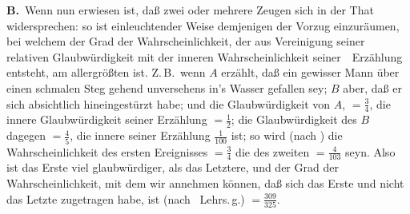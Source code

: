 \vabst \textbf{B.}~Wenn nun erwiesen ist, daß zwei oder mehrere Zeugen sich in der That widersprechen: so ist einleuchtender Weise demjenigen der Vorzug einzuräumen, bei welchem der Grad der Wahrscheinlichkeit, der aus Vereinigung seiner relativen Glaubwürdigkeit mit der inneren Wahrscheinlichkeit seiner~\ Erzählung entsteht, am allergrößten ist. Z.\,B.\ wenn $A$ erzählt, daß ein gewisser Mann über einen schmalen Steg gehend unversehens in's Wasser gefallen sey; $B$ aber, daß er sich absichtlich hineingestürzt habe; und die Glaubwürdigkeit von $A$, $= \frac{3}{4}$, die innere Glaubwürdigkeit seiner Erzählung $= \frac{1}{2}$; die Glaubwürdigkeit des $B$ dagegen $= \frac{4}{5}$, die innere seiner Erzählung $\frac{1}{100}$ ist; so wird (nach ) die Wahrscheinlichkeit des ersten Ereignisses $= \frac{3}{4}$ die des zweiten $= \frac{4}{103}$ seyn. Also ist das Erste viel glaubwürdiger, als das Letztere, und der Grad der Wahrscheinlichkeit, mit dem wir annehmen können, daß sich das Erste und nicht das Letzte zugetragen habe, ist (nach \ Lehrs.\,g.) $= \frac{309}{325}$.\par

